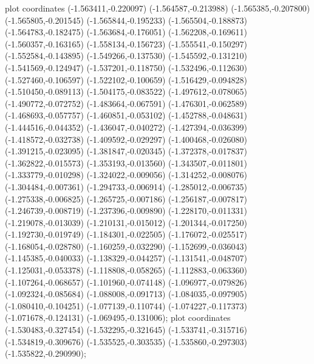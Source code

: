 { plot coordinates {(-1.563411,-0.220097) (-1.564587,-0.213988) (-1.565385,-0.207800) (-1.565805,-0.201545) (-1.565844,-0.195233) (-1.565504,-0.188873) (-1.564783,-0.182475) (-1.563684,-0.176051) (-1.562208,-0.169611) (-1.560357,-0.163165) (-1.558134,-0.156723) (-1.555541,-0.150297) (-1.552584,-0.143895) (-1.549266,-0.137530) (-1.545592,-0.131210) (-1.541569,-0.124947) (-1.537201,-0.118750) (-1.532496,-0.112630) (-1.527460,-0.106597) (-1.522102,-0.100659) (-1.516429,-0.094828) (-1.510450,-0.089113) (-1.504175,-0.083522) (-1.497612,-0.078065) (-1.490772,-0.072752) (-1.483664,-0.067591) (-1.476301,-0.062589) (-1.468693,-0.057757) (-1.460851,-0.053102) (-1.452788,-0.048631) (-1.444516,-0.044352) (-1.436047,-0.040272) (-1.427394,-0.036399) (-1.418572,-0.032738) (-1.409592,-0.029297) (-1.400468,-0.026080) (-1.391215,-0.023095) (-1.381847,-0.020345) (-1.372378,-0.017837) (-1.362822,-0.015573) (-1.353193,-0.013560) (-1.343507,-0.011801) (-1.333779,-0.010298) (-1.324022,-0.009056) (-1.314252,-0.008076) (-1.304484,-0.007361) (-1.294733,-0.006914) (-1.285012,-0.006735) (-1.275338,-0.006825) (-1.265725,-0.007186) (-1.256187,-0.007817) (-1.246739,-0.008719) (-1.237396,-0.009890) (-1.228170,-0.011331) (-1.219078,-0.013039) (-1.210131,-0.015012) (-1.201344,-0.017250) (-1.192730,-0.019749) (-1.184301,-0.022505) (-1.176072,-0.025517) (-1.168054,-0.028780) (-1.160259,-0.032290) (-1.152699,-0.036043) (-1.145385,-0.040033) (-1.138329,-0.044257) (-1.131541,-0.048707) (-1.125031,-0.053378) (-1.118808,-0.058265) (-1.112883,-0.063360) (-1.107264,-0.068657) (-1.101960,-0.074148) (-1.096977,-0.079826) (-1.092324,-0.085684) (-1.088008,-0.091713) (-1.084035,-0.097905) (-1.080410,-0.104251) (-1.077139,-0.110744) (-1.074227,-0.117373) (-1.071678,-0.124131) (-1.069495,-0.131006)};
 plot coordinates {(-1.530483,-0.327454) (-1.532295,-0.321645) (-1.533741,-0.315716) (-1.534819,-0.309676) (-1.535525,-0.303535) (-1.535860,-0.297303) (-1.535822,-0.290990)};
}
